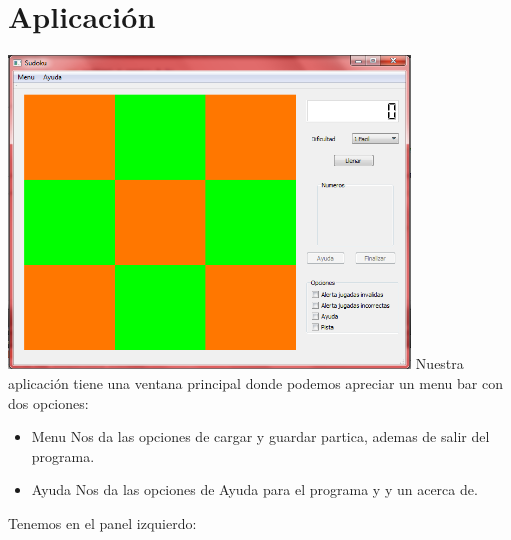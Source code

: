 \documentclass[12pt,oneside]{book}
\begin{document}
\chapter{Aplicación}
	\includegraphics[width=0.8\textwidth]{./imagenes/PantallaPrincipal.png}
	Nuestra aplicación tiene una ventana principal donde podemos apreciar un menu bar con dos opciones:
		\begin{itemize}
			\item Menu 
			Nos da las opciones de cargar y guardar partica, ademas de salir del programa.
			\item Ayuda
			Nos da las opciones de Ayuda para el programa y y un acerca de.
			\end {itemize}
	Tenemos en el panel izquierdo:
\end{document}
